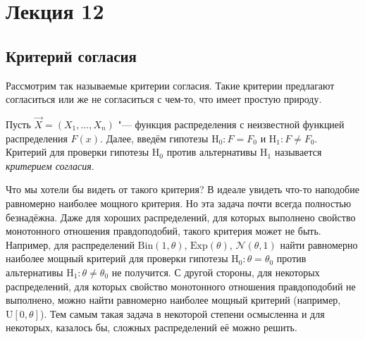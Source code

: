 
\section{Лекция 12}
\subsection{Критерий согласия}
Рассмотрим так называемые критерии согласия. Такие критерии предлагают согласиться или же не согласиться с чем-то, что имеет простую природу. 
\begin{definition}
	Пусть $\vec{X} = (X_{1}, \ldots, X_{n})$ "--- функция распределения с неизвестной функцией распределения $F(x)$. Далее, введём гипотезы $\mathrm{H}_{0} \colon F = F_{0}$ и $\mathrm{H}_{1} \colon F \neq F_{0}$. Критерий для проверки гипотезы $\mathrm{H}_{0}$ против альтернативы $\mathrm{H}_{1}$ называется \emph{критерием согласия}.
\end{definition}

Что мы хотели бы видеть от такого критерия? В идеале увидеть что-то наподобие равномерно наиболее мощного критерия. Но эта задача почти всегда полностью безнадёжна. Даже для хороших распределений, для которых выполнено свойство монотонного отношения правдоподобий, такого критерия может не быть. Например, для распределений $\mathrm{Bin}(1, \theta)$, $\mathrm{Exp}(\theta)$, $\mathcal{N}(\theta, 1)$ найти равномерно наиболее мощный критерий для проверки гипотезы $\mathrm{H}_{0} \colon \theta = \theta_{0}$ против альтернативы $\mathrm{H}_{1} \colon \theta \neq \theta_{0}$ не получится. С другой стороны, для некоторых распределений, для которых свойство монотонного отношения правдоподобий не выполнено, можно найти равномерно наиболее мощный критерий (например, $\mathrm{U}[0, \theta]$). Тем самым такая задача в некоторой степени осмысленна и для некоторых, казалось бы, сложных распределений её можно решить.

